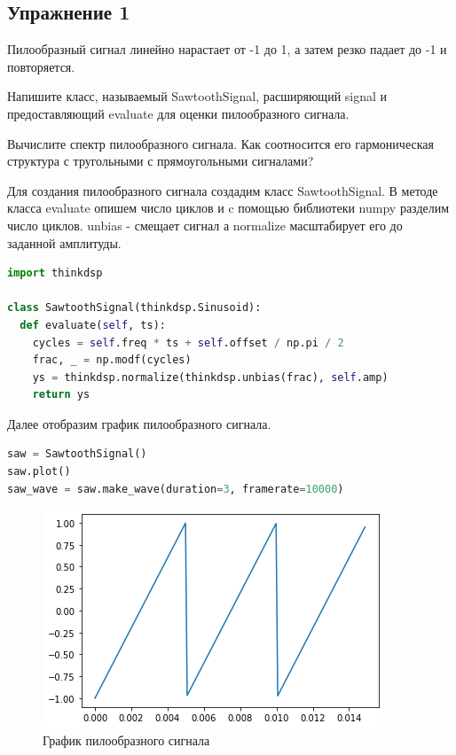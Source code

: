 \subsection{Упражнение 1}

Пилообразный сигнал линейно нарастает от -1 до 1, а затем резко падает до -1 и повторяется.

\noindent Напишите класс, называемый SawtoothSignal, расширяющий signal и предоставляющий evaluate для оценки пилообразного сигнала.

\noindent Вычислите спектр пилообразного сигнала. Как соотносится его гармоническая структура с тругольными с прямоугольными сигналами?

Для создания пилообразного сигнала создадим класс SawtoothSignal. В методе класса evaluate опишем число циклов и c помощью библиотеки numpy разделим число циклов. unbias - смещает сигнал а normalize масштабирует его до заданной амплитуды.

\begin{lstlisting}[language=Python]
import thinkdsp

class SawtoothSignal(thinkdsp.Sinusoid):
  def evaluate(self, ts):
    cycles = self.freq * ts + self.offset / np.pi / 2
    frac, _ = np.modf(cycles)
    ys = thinkdsp.normalize(thinkdsp.unbias(frac), self.amp)
    return ys
\end{lstlisting}

\noindent Далее отобразим график пилообразного сигнала.

\begin{lstlisting}[language=Python]
saw = SawtoothSignal()
saw.plot()
saw_wave = saw.make_wave(duration=3, framerate=10000)
\end{lstlisting}

\begin{figure}[H]
	\begin{center}
		\includegraphics[scale=1]{fig/lab02/lab2_1.png}
		\caption{График пилообразного сигнала}
	\end{center}
\end{figure}

